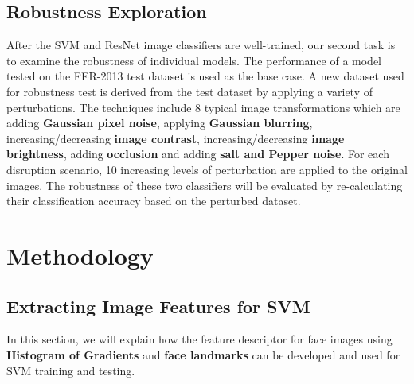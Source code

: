 \documentclass{article}
\begin{document}
\subsection{Robustness Exploration}
After the SVM and ResNet image classifiers are well-trained, our second task is to examine the robustness of individual models. The performance of a model tested on the FER-2013 test dataset is used as the base case. A new dataset used for robustness test is derived from the test dataset by applying a variety of perturbations. The techniques include 8 typical image transformations which are adding \textbf{Gaussian pixel noise}, applying \textbf{Gaussian blurring}, increasing/decreasing \textbf{image contrast}, increasing/decreasing \textbf{image brightness}, adding \textbf{occlusion} and adding \textbf{salt and Pepper noise}. For each disruption scenario, 10 increasing levels of perturbation are applied to the original images. The robustness of these two classifiers will be evaluated by re-calculating their classification accuracy based on the perturbed dataset. 


\section{Methodology}


\subsection{Extracting Image Features for SVM}
In this section, we will explain how the feature descriptor for face images using \textbf{Histogram of Gradients} and \textbf{face landmarks} can be developed and used for SVM training and testing.
\end{document}
